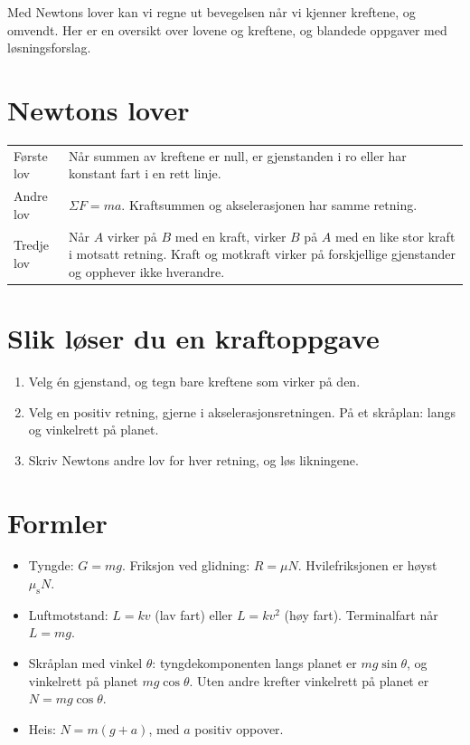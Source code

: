 \documentclass[11pt]{article}
\begin{document}

Med Newtons lover kan vi regne ut bevegelsen når vi kjenner kreftene, og omvendt. Her er en oversikt over lovene og kreftene, og blandede oppgaver med løsningsforslag.

\section*{Newtons lover}

\begin{center}\small
\begin{tabularx}{\linewidth}{YY}
\toprule
Første lov & Når summen av kreftene er null, er gjenstanden i ro eller har konstant fart i en rett linje. \\
Andre lov & $ΣF = ma$. Kraftsummen og akselerasjonen har samme retning. \\
Tredje lov & Når $A$ virker på $B$ med en kraft, virker $B$ på $A$ med en like stor kraft i motsatt retning. Kraft og motkraft virker på forskjellige gjenstander og opphever ikke hverandre. \\
\bottomrule
\end{tabularx}
\end{center}

\section*{Slik løser du en kraftoppgave}

\begin{enumerate}
\item Velg én gjenstand, og tegn bare kreftene som virker på den.
\item Velg en positiv retning, gjerne i akselerasjonsretningen. På et skråplan: langs og vinkelrett på planet.
\item Skriv Newtons andre lov for hver retning, og løs likningene.
\end{enumerate}

\section*{Formler}

\begin{itemize}
\item Tyngde: $G = mg$. Friksjon ved glidning: $R = μN$. Hvilefriksjonen er høyst $μ_{\mathrm{s}}N$.
\item Luftmotstand: $L = kv$ (lav fart) eller $L = kv^{2}$ (høy fart). Terminalfart når $L = mg$.
\item Skråplan med vinkel $θ$: tyngdekomponenten langs planet er $mg \sin  θ$, og vinkelrett på planet $mg \cos  θ$. Uten andre krefter vinkelrett på planet er $N = mg \cos  θ$.
\item Heis: $N = m(g + a)$, med $a$ positiv oppover.
\end{itemize}
\end{document}
